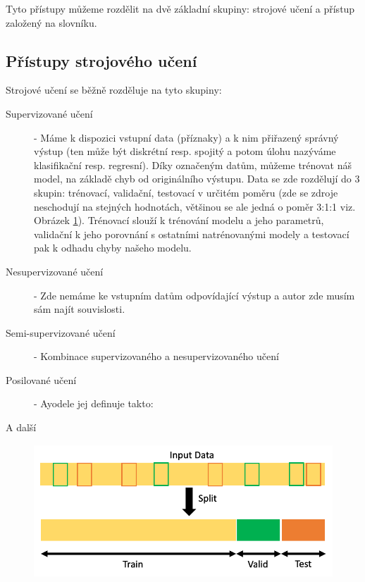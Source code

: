 Tyto přístupy můžeme rozdělit na dvě základní skupiny: strojové učení a přístup založený na slovníku.

\subsection{Přístupy strojového učení}

Strojové učení se běžně rozděluje na tyto skupiny: \cite{ml1} 

\begin{description}
	\item[Supervizované učení] - Máme k dispozici vstupní data (příznaky) a k nim přiřazený správný výstup (ten může být diskrétní resp. spojitý a potom úlohu nazýváme klasifikační resp. regresní). Díky označeným datům, můžeme trénovat náš model, na základě chyb od originálního výstupu. Data se zde rozdělují do 3 skupin: trénovací, validační, testovací v určitém poměru (zde se zdroje neschodují na stejných hodnotách, většinou se ale jedná o poměr 3:1:1 viz. Obrázek \ref{fig:datasplit}). Trénovací slouží k trénování modelu a jeho parametrů, validační k jeho porovnání s ostatními natrénovanými modely a testovací pak k odhadu chyby našeho modelu. 
	\item[Nesupervizované učení] - Zde nemáme ke vstupním datům odpovídající výstup a autor zde musím sám najít souvislosti. 
	\item[Semi-supervizované učení] - Kombinace supervizovaného a nesupervizovaného učení
	\item[Posilované učení] -  Ayodele jej definuje takto:  \cite[překlad vlastní]{ml1} 
	
	\item[A další] 
\end{description}


\begin{figure}[h]
    \centering
    \includegraphics[height=5cm]{text/img/data.png}
    \caption{}
    \label{fig:datasplit}
\end{figure}


